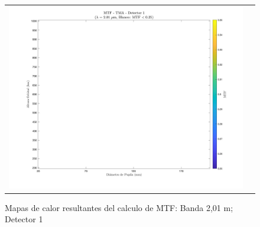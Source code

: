 \begin{landscape}
\begin{figure}[p]
\begin{tabular}{cc}
\includegraphics[width=0.48\linewidth]{4.Payload/MTF/MTF_Lambda2_Detector1_Telescopio4_heatmap.jpg} \\
\end{tabular}
\caption{Mapas de calor resultantes del calculo de MTF: Banda 2,01 \textmu m; Detector 1}
\end{figure}
\end{landscape}


